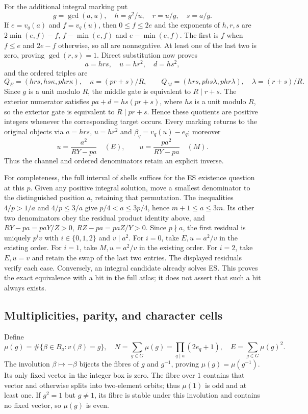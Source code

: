 For the additional integral marking put
\[
 g=\gcd(a,u),\quad h=g^2/u,\quad r=u/g,\quad s=a/g.
\]
If $e=v_q(a)$ and $f=v_q(u)$, then $0\leq f\leq2e$ and the exponents
of $h,r,s$ are $2\min(e,f)-f$, $f-\min(e,f)$ and
$e-\min(e,f)$. The first is $f$ when $f\leq e$ and $2e-f$ otherwise,
so all are nonnegative. At least one of the last two is zero, proving
$\gcd(r,s)=1$. Direct substitution now proves
\[
 a=hrs,\quad u=hr^2,\quad d=hs^2,
\]
and the ordered triples are
\[
 Q_E=(hrs,hs\kappa,phr\kappa),\quad\kappa=(pr+s)/R,
 \qquad
 Q_M=(hrs,phs\lambda,phr\lambda),\quad\lambda=(r+s)/R.
\]
Since $g$ is a unit modulo $R$, the middle gate is equivalent to
$R\mid r+s$. The exterior numerator satisfies
$pa+d=hs(pr+s)$, where $hs$ is a unit modulo $R$, so the exterior
gate is equivalent to $R\mid pr+s$. Hence these quotients are positive
integers whenever the corresponding target occurs. Every marking returns
to the original objects via $a=hrs$, $u=hr^2$ and
$\beta_q=v_q(u)-e_q$; moreover
\[
 u=\frac{a^2}{RY-pa}\quad(E),\qquad
 u=\frac{pa^2}{RY-pa}\quad(M).
\]
Thus the channel and ordered denominators retain an explicit inverse.

For completeness, the full interval of shells suffices for the ES
existence question at this $p$. Given any positive integral solution,
move a smallest denominator to the distinguished position $a$, retaining
that permutation. The inequalities
$4/p>1/a$ and $4/p\leq3/a$ give $p/4<a\leq3p/4$, hence
$m+1\leq a\leq3m$. Its other two denominators obey the residual product
identity above, and
$RY-pa=paY/Z>0$, $RZ-pa=paZ/Y>0$. Since $p\nmid a$, the first residual
is uniquely $p^i v$ with $i\in\{0,1,2\}$ and $v\mid a^2$.
For $i=0$, take $E,u=a^2/v$ in the existing order. For $i=1$, take
$M,u=a^2/v$ in the existing order. For $i=2$, take $E,u=v$ and retain
the swap of the last two entries. The displayed residuals verify each
case. Conversely, an integral candidate already solves ES. This proves
the exact equivalence with a hit in the full atlas; it does not assert
that such a hit always exists.

\subsection{Multiplicities, parity, and character cells}
Define
\[
 \mu(g)=\#\{\beta\in B_a:v(\beta)=g\},\quad
 N=\sum_{g\in G}\mu(g)=\prod_{q\mid a}(2e_q+1),\quad
 E=\sum_{g\in G}\mu(g)^2.
\]
The involution $\beta\mapsto-\beta$ bijects the fibres of $g$ and
$g^{-1}$, proving $\mu(g)=\mu(g^{-1})$. Its only fixed vector in the
integer box is zero. The fibre over $1$ contains that vector and otherwise
splits into two-element orbits; thus $\mu(1)$ is odd and at least one.
If $g^2=1$ but $g\ne1$, its fibre is stable under this involution and
contains no fixed vector, so $\mu(g)$ is even.

